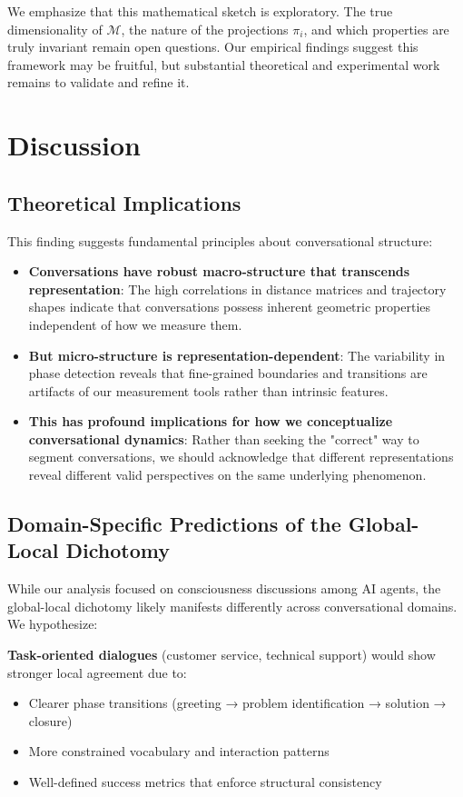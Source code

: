 \documentclass[11pt,letterpaper]{article}
\begin{document}
We emphasize that this mathematical sketch is exploratory. The true dimensionality of $\mathcal{M}$, the nature of the projections $\pi_i$, and which properties are truly invariant remain open questions. Our empirical findings suggest this framework may be fruitful, but substantial theoretical and experimental work remains to validate and refine it.

\section{Discussion}

\subsection{Theoretical Implications}

This finding suggests fundamental principles about conversational structure:
\begin{itemize}
\item \textbf{Conversations have robust macro-structure that transcends representation}: The high correlations in distance matrices and trajectory shapes indicate that conversations possess inherent geometric properties independent of how we measure them.
\item \textbf{But micro-structure is representation-dependent}: The variability in phase detection reveals that fine-grained boundaries and transitions are artifacts of our measurement tools rather than intrinsic features.
\item \textbf{This has profound implications for how we conceptualize conversational dynamics}: Rather than seeking the "correct" way to segment conversations, we should acknowledge that different representations reveal different valid perspectives on the same underlying phenomenon.
\end{itemize}

\subsection{Domain-Specific Predictions of the Global-Local Dichotomy}

While our analysis focused on consciousness discussions among AI agents, the global-local dichotomy likely manifests differently across conversational domains. We hypothesize:

\textbf{Task-oriented dialogues} (customer service, technical support) would show stronger local agreement due to:
\begin{itemize}
\item Clearer phase transitions (greeting → problem identification → solution → closure)
\item More constrained vocabulary and interaction patterns
\item Well-defined success metrics that enforce structural consistency
\end{itemize}
\end{document}
